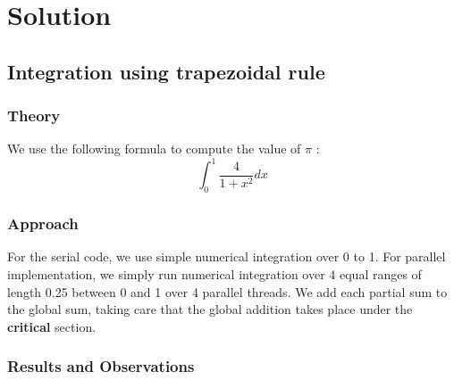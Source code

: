 \documentclass[12,a4paper]{article}
\begin{document}
    \section{Solution}
    \subsection{Integration using trapezoidal rule}
    \subsubsection{Theory}
    We use the following formula to compute the value of $\pi$ :
    \begin{equation}
        \int_{0}^{1} \frac{4}{1+x^2} dx
    \end{equation}
    
    \subsubsection{Approach}
    For the serial code, we use simple numerical integration over 0 to 1. For parallel implementation, we simply run numerical integration over 4 equal ranges of length 0.25 between 0 and 1 over 4 parallel threads. We add each partial sum to the global sum, taking care that the global addition takes place under the \textbf{critical} section.\newpage
    \subsubsection{Results and Observations}
    
\end{document}
